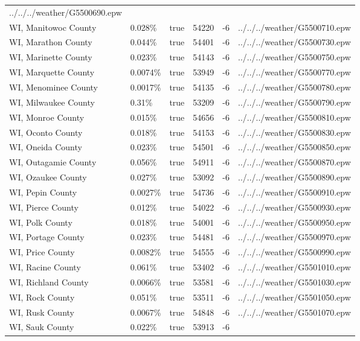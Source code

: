 \begin{longtable}[]{@{}llllll@{}}
../../../weather/G5500690.epw \\
WI, Manitowoc County & 0.028\% & true & 54220 & -6 &
../../../weather/G5500710.epw \\
WI, Marathon County & 0.044\% & true & 54401 & -6 &
../../../weather/G5500730.epw \\
WI, Marinette County & 0.023\% & true & 54143 & -6 &
../../../weather/G5500750.epw \\
WI, Marquette County & 0.0074\% & true & 53949 & -6 &
../../../weather/G5500770.epw \\
WI, Menominee County & 0.0017\% & true & 54135 & -6 &
../../../weather/G5500780.epw \\
WI, Milwaukee County & 0.31\% & true & 53209 & -6 &
../../../weather/G5500790.epw \\
WI, Monroe County & 0.015\% & true & 54656 & -6 &
../../../weather/G5500810.epw \\
WI, Oconto County & 0.018\% & true & 54153 & -6 &
../../../weather/G5500830.epw \\
WI, Oneida County & 0.023\% & true & 54501 & -6 &
../../../weather/G5500850.epw \\
WI, Outagamie County & 0.056\% & true & 54911 & -6 &
../../../weather/G5500870.epw \\
WI, Ozaukee County & 0.027\% & true & 53092 & -6 &
../../../weather/G5500890.epw \\
WI, Pepin County & 0.0027\% & true & 54736 & -6 &
../../../weather/G5500910.epw \\
WI, Pierce County & 0.012\% & true & 54022 & -6 &
../../../weather/G5500930.epw \\
WI, Polk County & 0.018\% & true & 54001 & -6 &
../../../weather/G5500950.epw \\
WI, Portage County & 0.023\% & true & 54481 & -6 &
../../../weather/G5500970.epw \\
WI, Price County & 0.0082\% & true & 54555 & -6 &
../../../weather/G5500990.epw \\
WI, Racine County & 0.061\% & true & 53402 & -6 &
../../../weather/G5501010.epw \\
WI, Richland County & 0.0066\% & true & 53581 & -6 &
../../../weather/G5501030.epw \\
WI, Rock County & 0.051\% & true & 53511 & -6 &
../../../weather/G5501050.epw \\
WI, Rusk County & 0.0067\% & true & 54848 & -6 &
../../../weather/G5501070.epw \\
WI, Sauk County & 0.022\% & true & 53913 & -6 &

\end{longtable}
